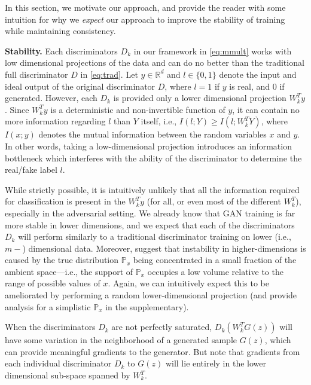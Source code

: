\documentclass{article}
\newcommand{\R}{\mathbb{R}}
\newcommand{\px}{\mathbb{P}_{x}}
\begin{document}
In this section, we  motivate our approach, and provide the reader with some intuition for why we \emph{expect} our approach to improve the stability of training while maintaining consistency.

\newcommand{\vol}{\mbox{Vol}}

\textbf{Stability.}  Each discriminators $D_k$ in our framework in \eqref{eq:mmult} works with low dimensional projections of the data and can do no better than the traditional full discriminator $D$ in \eqref{eq:trad}. Let $y \in \R^d$ and $l \in \{0,1\}$ denote the input and ideal output of the original discriminator $D$, where $l=1$ if $y$ is real, and $0$ if generated. However, each $D_k$ is provided only a lower dimensional projection $W_k^Ty$. Since $W_k^Ty$ is a deterministic and non-invertible function of $y$, it can contain no more information regarding $l$ than $Y$ itself, i.e., $I(l;Y) \geq I(l;W^T_kY)$, where $I(x;y)$ denotes the mutual information between the random variables $x$ and $y$. In other words, taking a low-dimensional projection introduces an information bottleneck which interferes with the ability of the discriminator to determine the real/fake label $l$.

While strictly possible, it is intuitively unlikely that all the information required for classification is present in the $W_k^Ty$ (for all, or even most of the different $W_k^T$), especially in the adversarial setting. We already know that GAN training is far more stable in lower dimensions, and we expect that each of the discriminators $D_k$ will perform similarly to a traditional discriminator training on lower  (i.e., $m-$) dimensional data. Moreover, \citet{arjovsky2017towards} suggest that instability in higher-dimensions is caused by the true distribution $\px$ being concentrated in a small fraction of the ambient space---i.e., the support of $\px$ occupies a low volume relative to the range of possible values of $x$. Again, we can intuitively expect this to be ameliorated by performing a random lower-dimensional projection (and provide analysis for a simplistic $\px$ in the supplementary).

When the discriminators $D_k$ are not perfectly saturated, $D_k(W^T_kG(z))$ will have some variation in the neighborhood of a generated sample $G(z)$, which can provide meaningful gradients to the generator. But note that gradients from each individual discriminator $D_k$  to $G(z)$ will lie entirely in the lower dimensional sub-space spanned by $W_k^T$.
\end{document}
